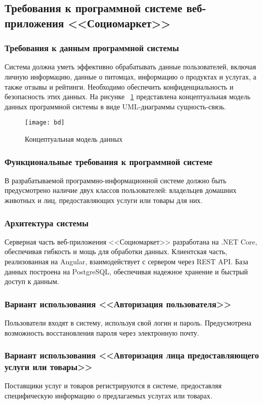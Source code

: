 \subsection{Требования к программной системе веб-приложения <<Социомаркет>>}
\subsubsection{Требования к данным программной системы}
Система должна уметь эффективно обрабатывать данные пользователей, включая личную информацию, данные о питомцах, информацию о продуктах и услугах, а также отзывы и рейтинги. Необходимо обеспечить конфиденциальность и безопасность этих данных.
На рисунке ~\ref{bd:image} представлена концептуальная модель данных программной системы в виде UML-диаграммы сущность-связь.

\begin{figure}[ht]
\texttt{[image: bd]}
\caption{Концептуальная модель данных}
\label{bd:image}
\end{figure}

\subsubsection{Функциональные требования к программной системе}
В разрабатываемой программно-информационной системе должно быть предусмотрено наличие двух классов пользователей: владельцев домашних животных и лиц, предоставляющих услуги или товары для них.

\subsubsection{Архитектура системы} 
Серверная часть веб-приложения <<Социомаркет>> разработана на .NET Core, обеспечивая гибкость и мощь для обработки данных. Клиентская часть, реализованная на Angular, взаимодействует с сервером через REST API. База данных построена на PostgreSQL, обеспечивая надежное хранение и быстрый доступ к данным.

\subsubsection{Вариант использования <<Авторизация пользователя>>} 
Пользователи входят в систему, используя свой логин и пароль. Предусмотрена возможность восстановления пароля через электронную почту.

\subsubsection{Вариант использования <<Авторизация лица предоставляющего услуги или товары>>} 
Поставщики услуг и товаров регистрируются в системе, предоставляя специфическую информацию о предлагаемых услугах или товарах.

